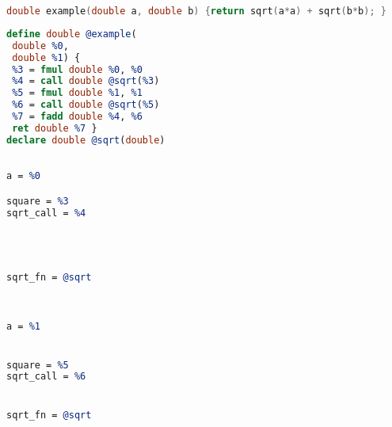 \centering
\begin{minipage}[t]{\textwidth}
\centering
\begin{minipage}[t]{\textwidth}
\centering
\vspace{-1em}
\begin{lstlisting}[language=C,basicstyle=\small\ttfamily,
                   numbers=none,framexleftmargin=0pt,xleftmargin=0pt,
                   captionpos=t,title={{\bf(a)} C program code:}]
 double example(double a, double b) {return sqrt(a*a) + sqrt(b*b); }
\end{lstlisting}
\end{minipage}
\begin{minipage}[t]{7.1cm}
\centering
\vspace{-0.19cm}
\begin{lstlisting}[language={LLVM},
                   captionpos=t,title={{\bf(b)} Resulting LLVM IR:}]
define double @example(    
 double %0,                
 double %1) {              
 %3 = fmul double %0, %0   
 %4 = call double @sqrt(%3)
 %5 = fmul double %1, %1   
 %6 = call double @sqrt(%5)
 %7 = fadd double %4, %6   
 ret double %7 }
declare double @sqrt(double)      
\end{lstlisting}
\end{minipage}
\hfill
\begin{minipage}[t]{3.5cm}
\centering
\vspace{-0.19cm}
\begin{lstlisting}[language=LLVM,
                   numbers=none,framexleftmargin=0pt,xleftmargin=0pt,
                   captionpos=t,title={{\bf(c)} First solution:}]

a = %0

square = %3
sqrt_call = %4 




sqrt_fn = @sqrt
\end{lstlisting}
\end{minipage}
\hfill
\begin{minipage}[t]{3.5cm}
\centering
\vspace{-0.19cm}
\begin{lstlisting}[language=LLVM,
                   numbers=none,framexleftmargin=0pt,xleftmargin=0pt,
                   captionpos=t,title={{\bf(d)} Second solution:}]


a = %1


square = %5
sqrt_call = %6


sqrt_fn = @sqrt
\end{lstlisting}
\end{minipage}
\end{minipage}

